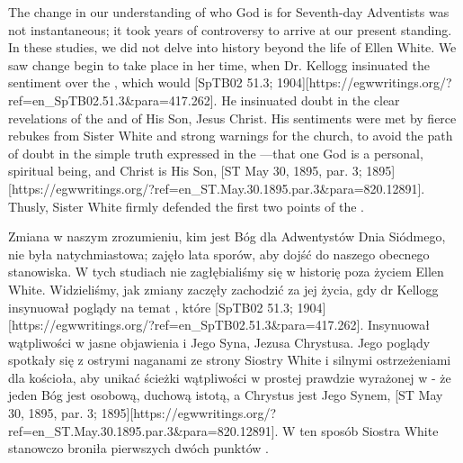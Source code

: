 The change in our understanding of who God is for Seventh-day Adventists was not instantaneous; it took years of controversy to arrive at our present standing. In these studies, we did not delve into history beyond the life of Ellen White. We saw change begin to take place in her time, when Dr. Kellogg insinuated the sentiment over the , which would [SpTB02 51.3; 1904][https://egwwritings.org/?ref=en\_SpTB02.51.3&para=417.262]. He insinuated doubt in the clear revelations of the  and of His Son, Jesus Christ. His sentiments were met by fierce rebukes from Sister White and strong warnings for the church, to avoid the path of doubt in the simple truth expressed in the —that one God is a personal, spiritual being, and Christ is His Son, [ST May 30, 1895, par. 3; 1895][https://egwwritings.org/?ref=en\_ST.May.30.1895.par.3&para=820.12891]. Thusly, Sister White firmly defended the first two points of the .


Zmiana w naszym zrozumieniu, kim jest Bóg dla Adwentystów Dnia Siódmego, nie była natychmiastowa; zajęło lata sporów, aby dojść do naszego obecnego stanowiska. W tych studiach nie zagłębialiśmy się w historię poza życiem Ellen White. Widzieliśmy, jak zmiany zaczęły zachodzić za jej życia, gdy dr Kellogg insynuował poglądy na temat , które [SpTB02 51.3; 1904][https://egwwritings.org/?ref=en\_SpTB02.51.3&para=417.262]. Insynuował wątpliwości w jasne objawienia  i Jego Syna, Jezusa Chrystusa. Jego poglądy spotkały się z ostrymi naganami ze strony Siostry White i silnymi ostrzeżeniami dla kościoła, aby unikać ścieżki wątpliwości w prostej prawdzie wyrażonej w  - że jeden Bóg jest osobową, duchową istotą, a Chrystus jest Jego Synem, [ST May 30, 1895, par. 3; 1895][https://egwwritings.org/?ref=en\_ST.May.30.1895.par.3&para=820.12891]. W ten sposób Siostra White stanowczo broniła pierwszych dwóch punktów .


